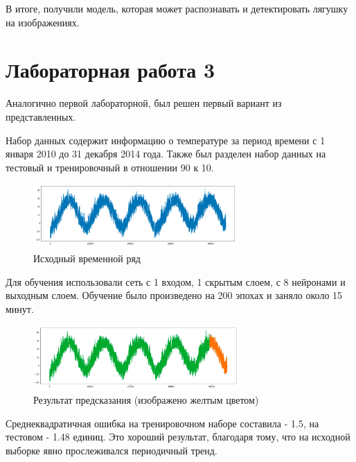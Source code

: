В итоге, получили модель, которая может распознавать и детектировать лягушку на изображениях.

\section{Лабораторная работа 3}
Аналогично первой лабораторной, был решен первый вариант из представленных.


Набор данных содержит информацию о температуре за период времени с 1 января 2010 до 31 декабря 2014 года. Также был разделен набор данных на тестовый и тренировочный в отношении 90 к 10.

\begin{figure}[htbp]
\centering
\includegraphics[width=0.7\textwidth]{fig/poll}
\caption{Исходный временной ряд}
\label{fig:poll}
\end{figure}

Для обучения использовали сеть с 1 входом, 1 скрытым слоем, с 8 нейронами и выходным слоем. Обучение было произведено на 200 эпохах и заняло около 15 минут.

\begin{figure}[htbp]
\centering
\includegraphics[width=0.7\textwidth]{fig/poll2}
\caption{Результат предсказания (изображено желтым цветом)}
\label{fig:poll}
\end{figure}

Среднеквадратичная ошибка на тренировочном наборе составила - 1.5, на тестовом - 1.48 единиц. Это хороший результат, благодаря тому, что на исходной выборке явно прослеживался периодичный тренд.